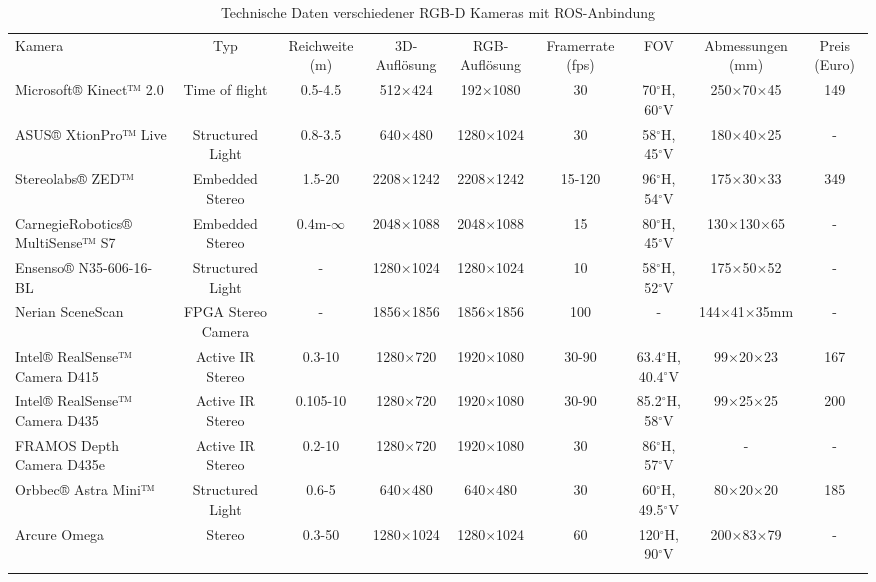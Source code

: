
\begin {table}[th!]
\setlength{\tabcolsep}{0.6mm}
\begin{tiny}
 \centering
 \caption{Technische Daten verschiedener RGB-D Kameras mit ROS-Anbindung \cite{ROSIND2020}}
 \label{tab:Kameras}
 \begin{tabulary}{\textwidth}{ L C C C C C C C C }
  \hhline{=========}
    Kamera & Typ & Reichweite (m) & 3D-Auflösung & RGB-Auflösung & Framerrate (fps) & FOV & Abmessungen (mm) & Preis (Euro)\\
  \hhline{=========}
  Microsoft® Kinect™ 2.0 & Time of flight & 0.5-4.5 & 512$\times$424 & 192$\times$1080 & 30 & 70$^\circ$H, 60$^\circ$V & 250$\times$70$\times$45 & 149  \\
  \hhline{---------}
  ASUS® XtionPro™ Live & Structured Light &  0.8-3.5 & 640$\times$480 & 1280$\times$1024 & 30 & 58$^\circ$H, 45$^\circ$V & 180$\times$40$\times$25 & - \\
  \hhline{---------}
  Stereolabs® ZED™& Embedded Stereo & 1.5-20 & 2208$\times$1242 & 2208$\times$1242 & 15-120 & 96$^\circ$H, 54$^\circ$V & 175$\times$30$\times$33 & 349 \\
  \hhline{---------}
  CarnegieRobotics® MultiSense™ S7 & Embedded Stereo & 0.4m-$\infty$ & 2048$\times$1088 & 2048$\times$1088 & 15 & 80$^\circ$H, 45$^\circ$V & 130$\times$130$\times$65 & - \\
  \hhline{---------}
  Ensenso® N35-606-16-BL & Structured Light & - & 1280$\times$1024 & 1280$\times$1024 & 10 & 58$^\circ$H, 52$^\circ$V & 175$\times$50$\times$52 & - \\
  \hhline{---------}
  Nerian SceneScan & FPGA Stereo Camera & - & 1856$\times$1856 & 1856$\times$1856 & 100 & - & 144$\times$41$\times$35mm & - \\
  \hhline{---------}
  Intel® RealSense™ Camera D415 & Active IR Stereo & 0.3-10 & 1280$\times$720 & 1920$\times$1080 & 30-90 & 63.4$^\circ$H, 40.4$^\circ$V & 99$\times$20$\times$23 & 167 \\
  \hhline{---------}
  Intel® RealSense™ Camera D435 & Active IR Stereo & 0.105-10 & 1280$\times$720 & 1920$\times$1080 & 30-90 & 85.2$^\circ$H, 58$^\circ$V & 99$\times$25$\times$25 & 200 \\
  \hhline{---------}
  FRAMOS Depth Camera D435e & Active IR Stereo & 0.2-10 & 1280$\times$720 & 1920$\times$1080 & 30 & 86$^\circ$H, 57$^\circ$V & - & - \\
  \hhline{---------}
  Orbbec® Astra Mini™ & Structured Light & 0.6-5 & 640$\times$480 & 640$\times$480 & 30 & 60$^\circ$H, 49.5$^\circ$V & 80$\times$20$\times$20 & 185 \\
  \hhline{---------}
  Arcure Omega & Stereo & 0.3-50 & 1280$\times$1024 & 1280$\times$1024 & 60 & 120$^\circ$H, 90$^\circ$V & 200$\times$83$\times$79 & - \\
   \hhline{=========}
\end{tabulary}
\end{tiny}
\end{table}
